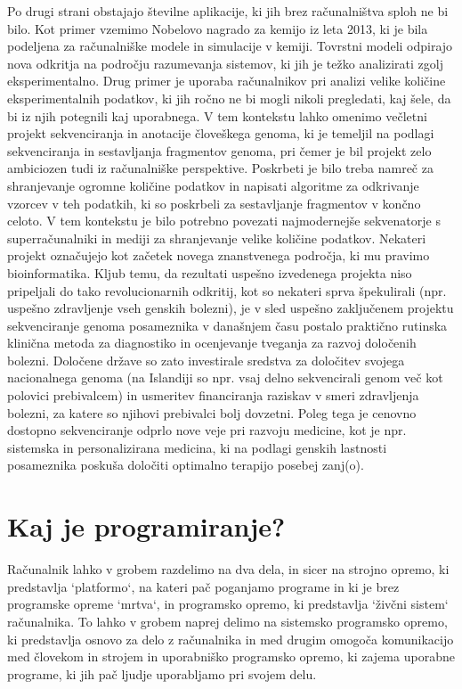 Po drugi strani obstajajo številne aplikacije, ki jih brez računalništva sploh ne bi bilo. Kot primer vzemimo Nobelovo nagrado za kemijo iz leta 2013, ki je bila podeljena za računalniške modele in simulacije v kemiji. Tovrstni modeli odpirajo nova odkritja na področju razumevanja sistemov, ki jih je težko analizirati zgolj eksperimentalno. Drug primer je uporaba računalnikov pri analizi velike količine eksperimentalnih podatkov, ki jih ročno ne bi mogli nikoli pregledati, kaj šele, da bi iz njih potegnili kaj uporabnega. V tem kontekstu lahko omenimo večletni projekt sekvenciranja in anotacije človeškega genoma, ki je temeljil na podlagi sekvenciranja in sestavljanja fragmentov genoma, pri čemer je bil projekt zelo ambiciozen tudi iz računalniške perspektive. Poskrbeti je bilo treba namreč za shranjevanje ogromne količine podatkov in napisati algoritme za odkrivanje vzorcev v teh podatkih, ki so poskrbeli za sestavljanje fragmentov v končno celoto. V tem kontekstu je bilo potrebno povezati najmodernejše sekvenatorje s superračunalniki in mediji za shranjevanje velike količine podatkov. Nekateri projekt označujejo kot začetek novega znanstvenega področja, ki mu pravimo bioinformatika. Kljub temu, da rezultati uspešno izvedenega projekta niso pripeljali do tako revolucionarnih odkritij, kot so nekateri sprva špekulirali (npr. uspešno zdravljenje vseh genskih bolezni), je v sled uspešno zaključenem projektu sekvenciranje genoma posameznika v današnjem času postalo praktično rutinska klinična metoda za diagnostiko in ocenjevanje tveganja za razvoj določenih bolezni. Določene države so zato investirale sredstva za določitev svojega nacionalnega genoma (na Islandiji so npr. vsaj delno sekvencirali genom več kot polovici prebivalcem) in usmeritev financiranja raziskav v smeri zdravljenja bolezni, za katere so njihovi prebivalci bolj dovzetni. Poleg tega je cenovno dostopno sekvenciranje odprlo nove veje pri razvoju medicine, kot je npr. sistemska in personalizirana medicina, ki na podlagi genskih lastnosti posameznika poskuša določiti optimalno terapijo posebej zanj(o).

\section{Kaj je programiranje?}

Računalnik lahko v grobem razdelimo na dva dela, in sicer na strojno opremo, ki predstavlja `platformo`, na kateri pač poganjamo programe in ki je brez programske opreme `mrtva`, in programsko opremo, ki predstavlja `živčni sistem` računalnika. To lahko v grobem naprej delimo na sistemsko programsko opremo, ki predstavlja osnovo za delo z računalnika in med drugim omogoča komunikacijo med človekom in strojem in uporabniško programsko opremo, ki zajema uporabne programe, ki jih pač ljudje uporabljamo pri svojem delu. 

